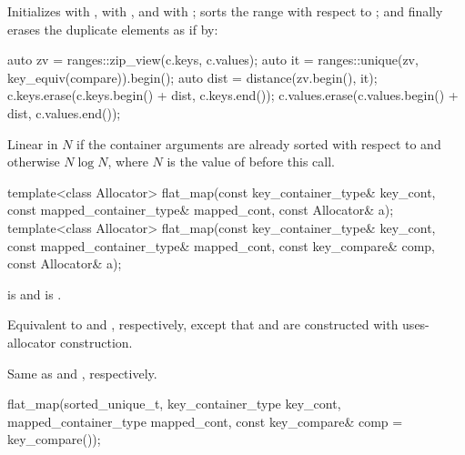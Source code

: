 \begin{itemdescr}
\pnum
\effects
Initializes
 with ,
 with , and
 with ;
sorts the range  with respect to ; and
finally erases the duplicate elements as if by:
\begin{codeblock}
auto zv = ranges::zip_view(c.keys, c.values);
auto it = ranges::unique(zv, key_equiv(compare)).begin();
auto dist = distance(zv.begin(), it);
c.keys.erase(c.keys.begin() + dist, c.keys.end());
c.values.erase(c.values.begin() + dist, c.values.end());
\end{codeblock}

\pnum
\complexity
Linear in $N$ if the container arguments are already sorted
with respect to  and otherwise $N \log N$,
where $N$ is the value of  before this call.
\end{itemdescr}

%
\begin{itemdecl}
template<class Allocator>
  flat_map(const key_container_type& key_cont, const mapped_container_type& mapped_cont,
           const Allocator& a);
template<class Allocator>
  flat_map(const key_container_type& key_cont, const mapped_container_type& mapped_cont,
           const key_compare& comp, const Allocator& a);
\end{itemdecl}

\begin{itemdescr}
\pnum
\constraints
{} is  and
 is .

\pnum
\effects
Equivalent to  and
, respectively,
except that  and  are constructed with
uses-allocator construction.

\pnum
\complexity
Same as  and
, respectively.
\end{itemdescr}

%
\begin{itemdecl}
flat_map(sorted_unique_t, key_container_type key_cont, mapped_container_type mapped_cont,
         const key_compare& comp = key_compare());
\end{itemdecl}

